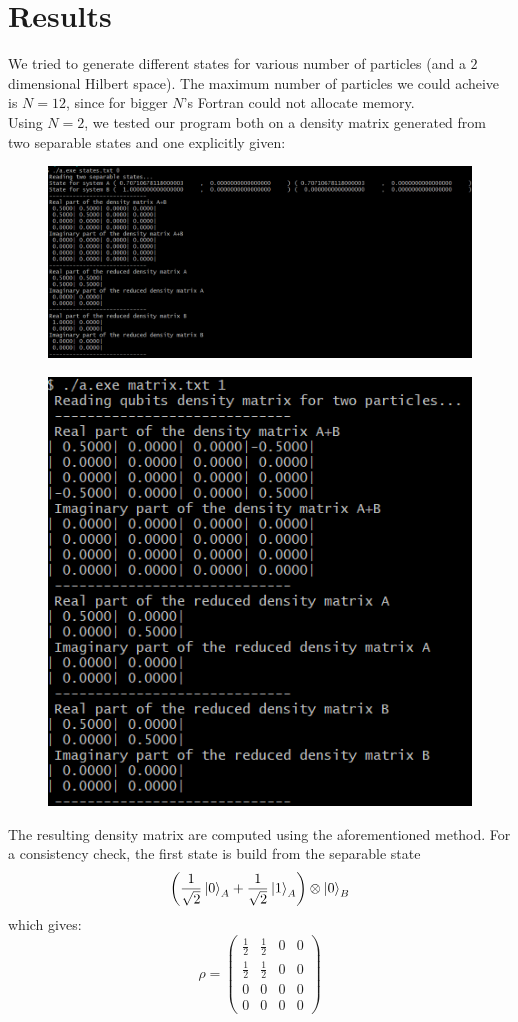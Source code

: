 \documentclass{article}
\begin{document}
\section*{Results}
We tried to generate different states for various number of particles (and a $2$ dimensional Hilbert space). The maximum number of particles we could acheive is $N=12$, since for bigger $N$'s Fortran could not allocate memory. \\
Using $N=2$, we tested our program both on a density matrix generated from two separable states and one explicitly given:
\begin{center}
\begin{figure}[h!]
	\includegraphics[width=0.85\linewidth]{sepstates.png}
\end{figure}
\begin{figure}[h!]
	\includegraphics[width=0.5\linewidth]{matrix.png}
\end{figure}
\end{center}
The resulting density matrix are computed using the aforementioned method. For a consistency check, the first state is build from the separable state
\begin{equation}
	\left(\frac{1}{\sqrt{2}}\ket{0}_A + \frac{1}{\sqrt{2}} \ket{1}_A \right) \otimes \ket{0}_B
\end{equation}
which gives:
\begin{equation}
	\rho = \left(
	\begin{array}{cccc}
	\frac{1}{2} & \frac{1}{2} & 0 & 0 \\ 
	\frac{1}{2} & \frac{1}{2} & 0 & 0 \\ 
	0 & 0 & 0 & 0 \\ 
	0 & 0 & 0 & 0
	\end{array} 
	\right)
\end{equation}
\end{document}
